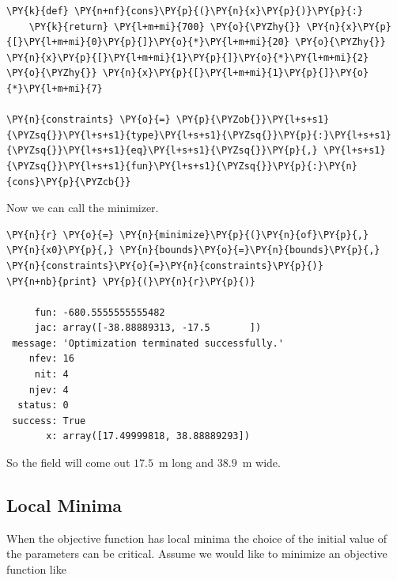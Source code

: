 \begin{tcolorbox}[breakable, size=fbox, boxrule=1pt, pad at break*=1mm,colback=cellbackground, colframe=cellborder]
\begin{Verbatim}[commandchars=\\\{\}]
\PY{k}{def} \PY{n+nf}{cons}\PY{p}{(}\PY{n}{x}\PY{p}{)}\PY{p}{:}
    \PY{k}{return} \PY{l+m+mi}{700} \PY{o}{\PYZhy{}} \PY{n}{x}\PY{p}{[}\PY{l+m+mi}{0}\PY{p}{]}\PY{o}{*}\PY{l+m+mi}{20} \PY{o}{\PYZhy{}} \PY{n}{x}\PY{p}{[}\PY{l+m+mi}{1}\PY{p}{]}\PY{o}{*}\PY{l+m+mi}{2} \PY{o}{\PYZhy{}} \PY{n}{x}\PY{p}{[}\PY{l+m+mi}{1}\PY{p}{]}\PY{o}{*}\PY{l+m+mi}{7}

\PY{n}{constraints} \PY{o}{=} \PY{p}{\PYZob{}}\PY{l+s+s1}{\PYZsq{}}\PY{l+s+s1}{type}\PY{l+s+s1}{\PYZsq{}}\PY{p}{:}\PY{l+s+s1}{\PYZsq{}}\PY{l+s+s1}{eq}\PY{l+s+s1}{\PYZsq{}}\PY{p}{,} \PY{l+s+s1}{\PYZsq{}}\PY{l+s+s1}{fun}\PY{l+s+s1}{\PYZsq{}}\PY{p}{:}\PY{n}{cons}\PY{p}{\PYZcb{}}
\end{Verbatim}
\end{tcolorbox}

    Now we can call the minimizer.

    \begin{tcolorbox}[breakable, size=fbox, boxrule=1pt, pad at break*=1mm,colback=cellbackground, colframe=cellborder]
\begin{Verbatim}[commandchars=\\\{\}]
\PY{n}{r} \PY{o}{=} \PY{n}{minimize}\PY{p}{(}\PY{n}{of}\PY{p}{,} \PY{n}{x0}\PY{p}{,} \PY{n}{bounds}\PY{o}{=}\PY{n}{bounds}\PY{p}{,} \PY{n}{constraints}\PY{o}{=}\PY{n}{constraints}\PY{p}{)}
\PY{n+nb}{print} \PY{p}{(}\PY{n}{r}\PY{p}{)}

     fun: -680.5555555555482
     jac: array([-38.88889313, -17.5       ])
 message: 'Optimization terminated successfully.'
    nfev: 16
     nit: 4
    njev: 4
  status: 0
 success: True
       x: array([17.49999818, 38.88889293])
    \end{Verbatim}
\end{tcolorbox}

So the field will come out \(17.5\)~m long and \(38.9\)~m wide.

\subsection{Local Minima}
When the objective function has local minima the choice of the initial value of the parameters can be critical. 
Assume we would like to minimize an objective function like 

